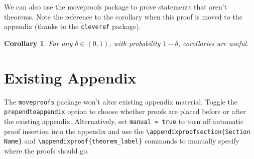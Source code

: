 \documentclass{article}
\newtheorem{corollary}[theorem]{Corollary}
\newtheorem{lemma}[theorem]{Lemma}
\begin{document}

\noindent We can also use the moveproofs package to prove statements that aren't theorems.
Note the reference to the corollary when this proof is moved to the appendix (thanks to the \texttt{cleveref} package).

\begin{corollary}\label{corollary_two}
For any $\delta \in (0, 1)$, with probability $1 - \delta$, corollaries are useful.
\end{corollary}


\appendix
\section{Existing Appendix}
The \texttt{moveproofs} package won't alter existing appendix material.
Toggle the \texttt{prependtoappendix} option to choose whether proofs are placed before or after the existing appendix.
Alternatively, set \texttt{manual = true} to turn off automatic proof insertion into the appendix and use the \texttt{\textbackslash appendixproofsection\{Section Name\}} and \texttt{\textbackslash appendixproof\{theorem\_label\}} commands to manually specify where the proofs should go.
\end{document}
